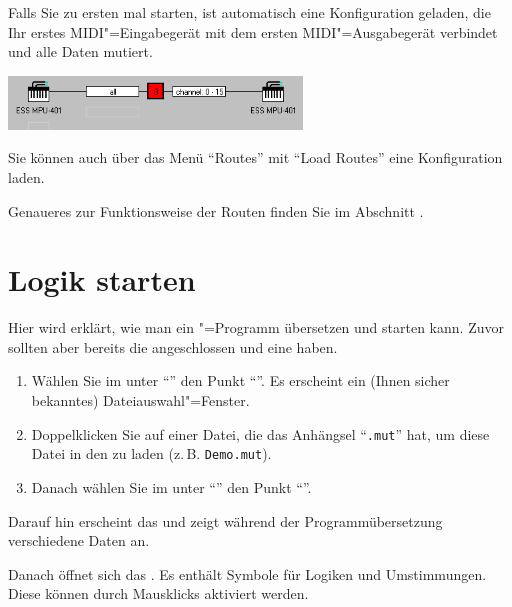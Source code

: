 Falls Sie \mutabor{} zu ersten mal starten, ist automatisch 
eine Konfiguration geladen, die Ihr erstes MIDI"=Eingabegerät 
mit dem ersten MIDI"=Ausgabegerät verbindet und alle Daten mutiert.

\begin{center}
\ifhtml
{}
\else
\includegraphics[width=221.5pt]{cc_route}
\fi
\end{center}

Sie können auch über das Menü "`Routes"' mit "`Load Routes"' eine
Konfiguration laden.

Genaueres zur Funktionsweise der Routen finden Sie im Abschnitt
.


\section{Logik  starten}
\label{sec:CC_LOGIC}

Hier wird erklärt, wie man ein \mutabor{}"=Programm übersetzen 
und starten kann. Zuvor sollten aber bereits die 
angeschlossen und eine  haben.

\begin{enumerate}
\item Wählen Sie im  unter
  "`"' den Punkt "`"'. Es
  erscheint ein (Ihnen sicher bekanntes) Dateiauswahl"=Fenster.
\item Doppelklicken Sie auf einer Datei, die das Anhängsel
  "`\texttt{.mut}"' hat, um diese Datei in den
   zu laden (z.\,B.
  \texttt{Demo.mut}).
\item Danach wählen Sie im  unter
  "`"' den Punkt
  "`"'.
\end{enumerate}

Darauf hin erscheint das  und
zeigt während der Programmübersetzung verschiedene Daten an.

Danach öffnet sich das . Es enthält 
Symbole für Logiken und Umstimmungen. Diese können durch 
Mausklicks aktiviert werden.


